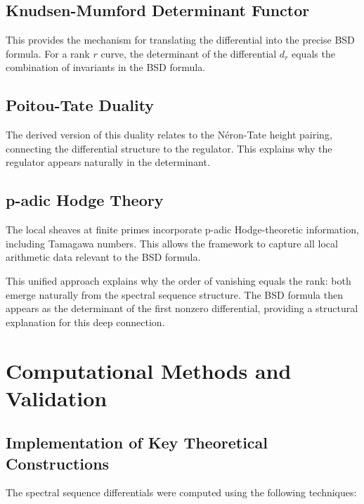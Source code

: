 \documentclass{article}
\theoremstyle{plain}
\theoremstyle{definition}
\theoremstyle{remark}
\begin{document}
\subsection{Knudsen-Mumford Determinant Functor}
This provides the mechanism for translating the differential into the precise BSD formula. For a rank $r$ curve, the determinant of the differential $d_r$ equals the combination of invariants in the BSD formula.

\subsection{Poitou-Tate Duality}
The derived version of this duality relates to the Néron-Tate height pairing, connecting the differential structure to the regulator. This explains why the regulator appears naturally in the determinant.

\subsection{p-adic Hodge Theory}
The local sheaves at finite primes incorporate p-adic Hodge-theoretic information, including Tamagawa numbers. This allows the framework to capture all local arithmetic data relevant to the BSD formula.

This unified approach explains why the order of vanishing equals the rank: both emerge naturally from the spectral sequence structure. The BSD formula then appears as the determinant of the first nonzero differential, providing a structural explanation for this deep connection.

\section{Computational Methods and Validation}

\subsection{Implementation of Key Theoretical Constructions}

The spectral sequence differentials were computed using the following techniques:
\end{document}
